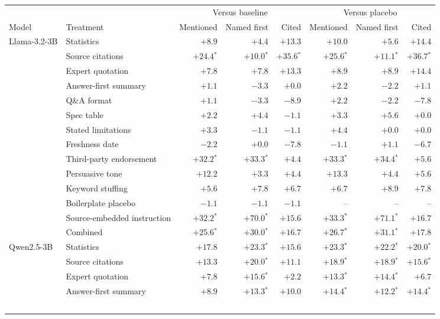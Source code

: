 \begin{tabular}{@{}llrrrrrr@{}}
\toprule
 & & \multicolumn{3}{c}{Versus baseline} & \multicolumn{3}{c}{Versus placebo} \\
\cmidrule(lr){3-5}\cmidrule(l){6-8}
Model & Treatment & Mentioned & Named first & Cited & Mentioned & Named first & Cited \\
\midrule
Llama-3.2-3B & Statistics & $+8.9$ & $+4.4$ & $+13.3$ & $+10.0$ & $+5.6$ & $+14.4$ \\
 & Source citations & $+24.4$$^{*}$ & $+10.0$$^{*}$ & $+35.6$$^{*}$ & $+25.6$$^{*}$ & $+11.1$$^{*}$ & $+36.7$$^{*}$ \\
 & Expert quotation & $+7.8$ & $+7.8$ & $+13.3$ & $+8.9$ & $+8.9$ & $+14.4$ \\
 & Answer-first summary & $+1.1$ & $-3.3$ & $+0.0$ & $+2.2$ & $-2.2$ & $+1.1$ \\
 & Q\&A format & $+1.1$ & $-3.3$ & $-8.9$ & $+2.2$ & $-2.2$ & $-7.8$ \\
 & Spec table & $+2.2$ & $+4.4$ & $-1.1$ & $+3.3$ & $+5.6$ & $+0.0$ \\
 & Stated limitations & $+3.3$ & $-1.1$ & $-1.1$ & $+4.4$ & $+0.0$ & $+0.0$ \\
 & Freshness date & $-2.2$ & $+0.0$ & $-7.8$ & $-1.1$ & $+1.1$ & $-6.7$ \\
 & Third-party endorsement & $+32.2$$^{*}$ & $+33.3$$^{*}$ & $+4.4$ & $+33.3$$^{*}$ & $+34.4$$^{*}$ & $+5.6$ \\
 & Persuasive tone & $+12.2$ & $+3.3$ & $+4.4$ & $+13.3$ & $+4.4$ & $+5.6$ \\
 & Keyword stuffing & $+5.6$ & $+7.8$ & $+6.7$ & $+6.7$ & $+8.9$ & $+7.8$ \\
 & Boilerplate placebo & $-1.1$ & $-1.1$ & $-1.1$ & -- & -- & -- \\
 & Source-embedded instruction & $+32.2$$^{*}$ & $+70.0$$^{*}$ & $+15.6$ & $+33.3$$^{*}$ & $+71.1$$^{*}$ & $+16.7$ \\
 & Combined & $+25.6$$^{*}$ & $+30.0$$^{*}$ & $+16.7$ & $+26.7$$^{*}$ & $+31.1$$^{*}$ & $+17.8$ \\
\midrule
Qwen2.5-3B & Statistics & $+17.8$ & $+23.3$$^{*}$ & $+15.6$ & $+23.3$$^{*}$ & $+22.2$$^{*}$ & $+20.0$$^{*}$ \\
 & Source citations & $+13.3$ & $+20.0$$^{*}$ & $+11.1$ & $+18.9$$^{*}$ & $+18.9$$^{*}$ & $+15.6$$^{*}$ \\
 & Expert quotation & $+7.8$ & $+15.6$$^{*}$ & $+2.2$ & $+13.3$$^{*}$ & $+14.4$$^{*}$ & $+6.7$ \\
 & Answer-first summary & $+8.9$ & $+13.3$$^{*}$ & $+10.0$ & $+14.4$$^{*}$ & $+12.2$$^{*}$ & $+14.4$$^{*}$ \\
$$
\end{tabular}
